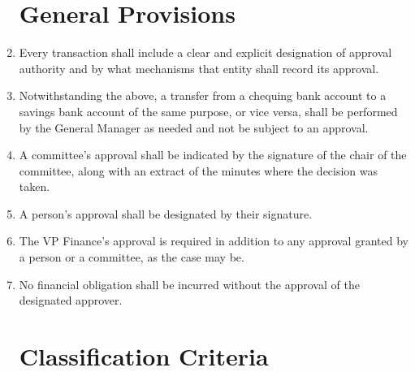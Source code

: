 \documentclass[oneside]{book}
\begin{document}
\begin{enumerate}
\section{\label{Approval_Authority_General_Provisions}General Provisions}

\item Every transaction shall include a clear and explicit designation of approval authority and by what mechanisms that entity shall record its approval.
\item Notwithstanding the above, a transfer from a chequing bank account to a savings bank account of the same purpose, or vice versa, shall be performed by the General Manager as needed and not be subject to an approval.
\item A committee’s approval shall be indicated by the signature of the chair of the committee, along with an extract of the minutes where the decision was taken. 
\item A person’s approval shall be designated by their signature. 
\item The VP Finance’s approval is required in addition to any approval granted by a person or a committee, as the case may be. 
\item No financial obligation shall be incurred without the approval of the designated approver.

\section{\label{Classification_Criteria}Classification Criteria}


\end{enumerate}
\end{document}
